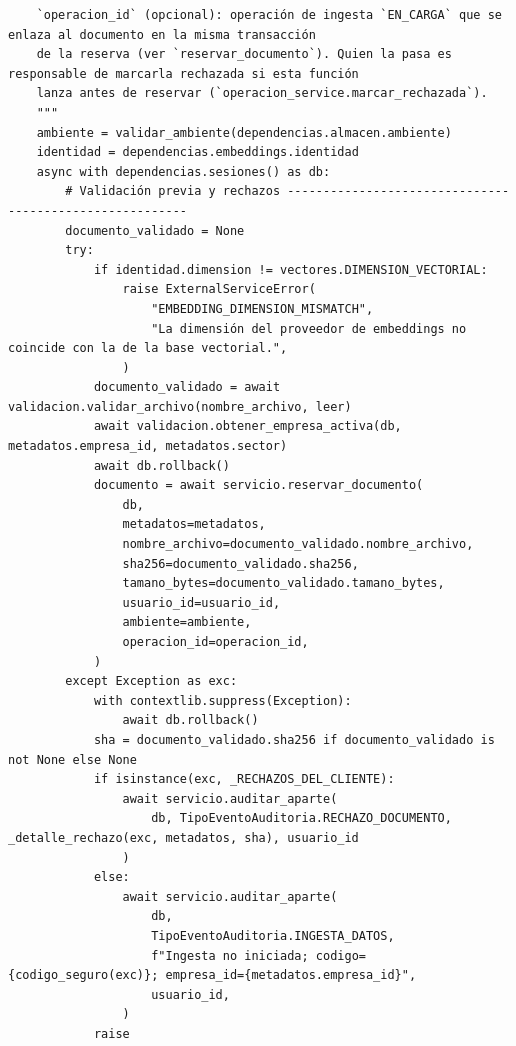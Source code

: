 \documentclass[11pt,a4paper]{article}
\begin{document}
\begin{lstlisting}
    `operacion_id` (opcional): operación de ingesta `EN_CARGA` que se enlaza al documento en la misma transacción
    de la reserva (ver `reservar_documento`). Quien la pasa es responsable de marcarla rechazada si esta función
    lanza antes de reservar (`operacion_service.marcar_rechazada`).
    """
    ambiente = validar_ambiente(dependencias.almacen.ambiente)
    identidad = dependencias.embeddings.identidad
    async with dependencias.sesiones() as db:
        # Validación previa y rechazos --------------------------------------------------------
        documento_validado = None
        try:
            if identidad.dimension != vectores.DIMENSION_VECTORIAL:
                raise ExternalServiceError(
                    "EMBEDDING_DIMENSION_MISMATCH",
                    "La dimensión del proveedor de embeddings no coincide con la de la base vectorial.",
                )
            documento_validado = await validacion.validar_archivo(nombre_archivo, leer)
            await validacion.obtener_empresa_activa(db, metadatos.empresa_id, metadatos.sector)
            await db.rollback()
            documento = await servicio.reservar_documento(
                db,
                metadatos=metadatos,
                nombre_archivo=documento_validado.nombre_archivo,
                sha256=documento_validado.sha256,
                tamano_bytes=documento_validado.tamano_bytes,
                usuario_id=usuario_id,
                ambiente=ambiente,
                operacion_id=operacion_id,
            )
        except Exception as exc:
            with contextlib.suppress(Exception):
                await db.rollback()
            sha = documento_validado.sha256 if documento_validado is not None else None
            if isinstance(exc, _RECHAZOS_DEL_CLIENTE):
                await servicio.auditar_aparte(
                    db, TipoEventoAuditoria.RECHAZO_DOCUMENTO, _detalle_rechazo(exc, metadatos, sha), usuario_id
                )
            else:
                await servicio.auditar_aparte(
                    db,
                    TipoEventoAuditoria.INGESTA_DATOS,
                    f"Ingesta no iniciada; codigo={codigo_seguro(exc)}; empresa_id={metadatos.empresa_id}",
                    usuario_id,
                )
            raise


\end{lstlisting}
\end{document}
